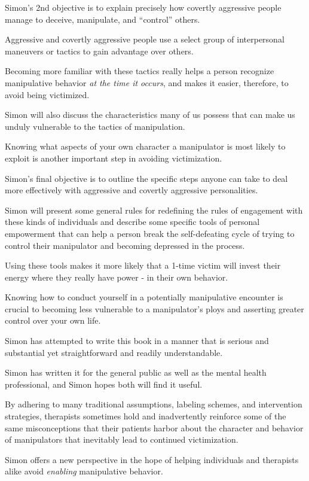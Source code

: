 \documentclass[oneside]{book}
\numberwithin{equation}{section}
\begin{document}
%
Simon's 2nd objective is to explain precisely how covertly aggressive people manage to deceive, manipulate, and ``control'' others.

Aggressive and covertly aggressive people use a select group of interpersonal maneuvers or tactics to gain advantage over others.

Becoming more familiar with these tactics really helps a person recognize manipulative behavior \textit{at the time it occurs}, and makes it easier, therefore, to avoid being victimized.

Simon will also discuss the characteristics many of us possess that can make us unduly vulnerable to the tactics of manipulation.

Knowing what aspects of your own character a manipulator is most likely to exploit is another important step in avoiding victimization.

%
Simon's final objective is to outline the specific steps anyone can take to deal more effectively with aggressive and covertly aggressive personalities.

Simon will present some general rules for redefining the rules of engagement with these kinds of individuals and describe some specific tools of personal empowerment that can help a person break the self-defeating cycle of trying to control their manipulator and becoming depressed in the process.

Using these tools makes it more likely that a 1-time victim will invest their energy where they really have power - in their own behavior.

Knowing how to conduct yourself in a potentially manipulative encounter is crucial to becoming less vulnerable to a manipulator's ploys and asserting greater control over your own life.

%
Simon has attempted to write this book in a manner that is serious and substantial yet straightforward and readily understandable.

Simon has written it for the general public as well as the mental health professional, and Simon hopes both will find it useful.

By adhering to many traditional assumptions, labeling schemes, and intervention strategies, therapists sometimes hold and inadvertently reinforce some of the same misconceptions that their patients harbor about the character and behavior of manipulators that inevitably lead to continued victimization.

Simon offers a new perspective in the hope of helping individuals and therapists alike avoid \textit{enabling} manipulative behavior.
\end{document}
